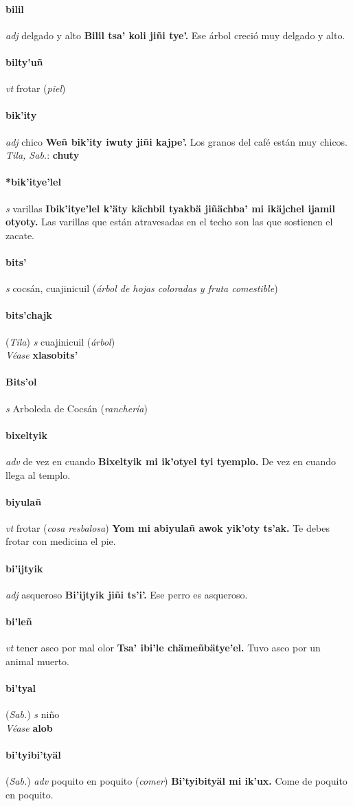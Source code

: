 \documentclass{scrbook}
\newcommand{\entry}[1]{\paragraph{#1}}
\newcommand{\partofspeech}[1]{\textit{#1}}
\newcommand{\spanishtranslation}[1]{#1}
\newcommand{\clarification}[1]{(\textit{#1})}
\newcommand{\cholexample}[1]{\textbf{#1}}
\newcommand{\exampletranslation}[1]{#1}
\newcommand{\dialectvariant}[1]{\\\textit{#1}:}
\newcommand{\dialectword}[1]{\textbf{#1}}
\newcommand{\alsosee}[1]{\\\textit{Véase} \textbf{#1}}
\newcommand{\relevantdialect}[1]{(\textit{#1})}
\begin{document}
\begin{multicols}{2}
\entry{bilil}
\partofspeech{adj}
\spanishtranslation{delgado y alto}
\cholexample{Bilil tsa' koli jiñi tye'.}
\exampletranslation{Ese árbol creció muy delgado y alto.}

\entry{bilty'uñ}
\partofspeech{vt}
\spanishtranslation{frotar}
\clarification{piel}

\entry{bik'ity}
\partofspeech{adj}
\spanishtranslation{chico}
\cholexample{Weñ bik'ity iwuty jiñi kajpe'.}
\exampletranslation{Los granos del café están muy chicos.}
\dialectvariant{Tila, Sab.}
\dialectword{chuty}

\entry{*bik'itye'lel}
\partofspeech{s}
\spanishtranslation{varillas}
\cholexample{Ibik'itye'lel k'äty kächbil tyakbä jiñächba' mi ikäjchel ijamil otyoty.}
\exampletranslation{Las varillas que están atravesadas en el techo son las que sostienen el zacate.}

\entry{bits'}
\partofspeech{s}
\spanishtranslation{cocsán, cuajinicuil}
\clarification{árbol de hojas coloradas y fruta comestible}

\entry{bits'chajk}
\relevantdialect{Tila}
\partofspeech{s}
\spanishtranslation{cuajinicuil}
\clarification{árbol}
\alsosee{xlasobits'}

\entry{Bits'ol}
\partofspeech{s}
\spanishtranslation{Arboleda de Cocsán}
\clarification{ranchería}

\entry{bixeltyik}
\partofspeech{adv}
\spanishtranslation{de vez en cuando}
\cholexample{Bixeltyik mi ik'otyel tyi tyemplo.}
\exampletranslation{De vez en cuando llega al templo.}

\entry{biyulañ}
\partofspeech{vt}
\spanishtranslation{frotar}
\clarification{cosa resbalosa}
\cholexample{Yom mi abiyulañ awok yik'oty ts'ak.}
\exampletranslation{Te debes frotar con medicina el pie.}

\entry{bi'ijtyik}
\partofspeech{adj}
\spanishtranslation{asqueroso}
\cholexample{Bi'ijtyik jiñi ts'i'.}
\exampletranslation{Ese perro es asqueroso.}

\entry{bi'leñ}
\partofspeech{vt}
\spanishtranslation{tener asco por mal olor}
\cholexample{Tsa' ibi'le chämeñbätye'el.}
\exampletranslation{Tuvo asco por un animal muerto.}

\entry{bi'tyal}
\relevantdialect{Sab.}
\partofspeech{s}
\spanishtranslation{niño}
\alsosee{alob}

\entry{bi'tyibi'tyäl}
\relevantdialect{Sab.}
\partofspeech{adv}
\spanishtranslation{poquito en poquito}
\clarification{comer}
\cholexample{Bi'tyibityäl mi ik'ux.}
\exampletranslation{Come de poquito en poquito.}


\end{multicols}
\end{document}
